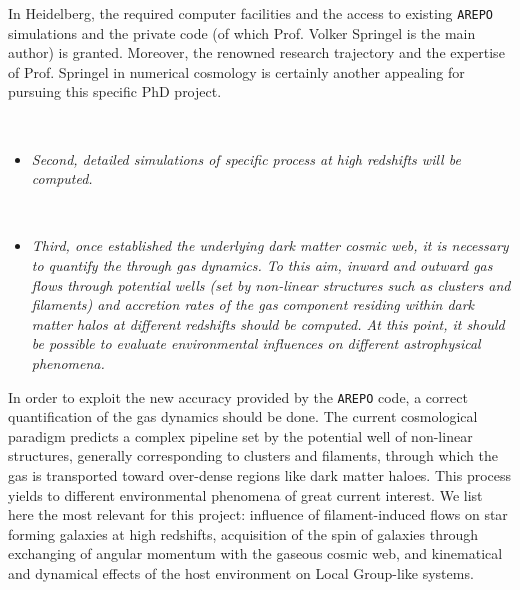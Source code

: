 \documentclass[a4,useAMS,usenatbib,usegraphicx,12pt]{article}
\begin{document}
In Heidelberg, the required computer facilities and the access to existing 
\texttt{AREPO} simulations and the private code (of which Prof. Volker 
Springel is the main author) is granted. Moreover, the renowned research 
trajectory and the expertise of Prof. Springel in numerical cosmology is 
certainly another appealing for pursuing this specific PhD project.

\

\begin{itemize}

\item[\checkmark] \textit{Second, detailed simulations of specific process at
high redshifts will be computed.}

\end{itemize}


\

\begin{itemize}

\item[\checkmark] \textit{Third, once established the underlying dark matter 
cosmic web, it is necessary to quantify the through gas dynamics. To this aim, 
inward and outward gas flows through potential wells (set by non-linear 
structures such as clusters and filaments) and accretion rates of the gas 
component residing within dark matter halos at different redshifts should be 
computed. At this point, it should be possible to evaluate environmental
influences on different astrophysical phenomena. }

\end{itemize}


In order to exploit the new accuracy provided by the \texttt{AREPO} code, a 
correct quantification of the gas dynamics should be done. The current 
cosmological paradigm predicts a complex pipeline set by the potential well of 
non-linear structures, generally corresponding to clusters and filaments, 
through which the gas is transported toward over-dense regions like dark matter 
haloes. This process yields to different environmental phenomena of great current 
interest. We list here the most relevant for this project: influence of 
filament-induced flows on star forming galaxies at high redshifts, acquisition of 
the spin of galaxies through exchanging of angular momentum with the gaseous 
cosmic web, and kinematical and dynamical effects of the host environment on Local 
Group-like systems.



\end{document}
